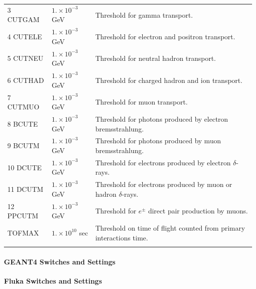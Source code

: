 \begin{longtable}{p{}p{}p{}}
    \footnotesize
    3 CUTGAM & $1.\times 10^{-3}$ GeV & Threshold for gamma transport.\\
    \footnotesize
    4 CUTELE & $1.\times 10^{-3}$ GeV & Threshold for electron and positron 
                                   transport.\\
    \footnotesize
    5 CUTNEU & $1.\times 10^{-3}$ GeV & Threshold for neutral hadron 
                                         transport.\\
    \footnotesize
    6 CUTHAD & $1.\times 10^{-3}$ GeV & Threshold for charged hadron 
                                        and ion transport.\\
    \footnotesize
    7 CUTMUO & $1.\times 10^{-3}$ GeV & Threshold for muon transport.\\
    \footnotesize
    8 BCUTE &  $1.\times 10^{-3}$ GeV & Threshold for photons produced by 
                                   electron bremsstrahlung.\\ 
    \footnotesize
    9 BCUTM &  $1.\times 10^{-3}$ GeV & Threshold for photons produced by 
                                   muon bremsstrahlung.\\ 
    \footnotesize
    10 DCUTE &  $1.\times 10^{-3}$ GeV & Threshold for electrons produced by 
                                    electron $\delta$-rays.\\ 
    \footnotesize
    11 DCUTM &  $1.\times 10^{-3}$ GeV & Threshold for electrons produced by 
                                    muon or hadron $\delta$-rays.\\ 
    \footnotesize
    12 PPCUTM & $1.\times 10^{-3}$ GeV & Threshold for $e^{\pm}$ direct pair 
                                    production by muons.\\
    \footnotesize
    TOFMAX & $1.\times 10^{10}$ sec & Threshold on time of flight counted 
                                       from primary interactions time.\\ 

   \label{table:GEANT3PhysicsLimits}
\end{longtable}

\paragraph{GEANT4 Switches and Settings}

\paragraph{Fluka Switches and Settings}

